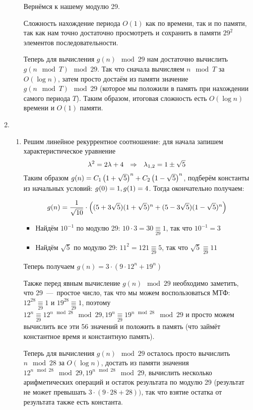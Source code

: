 \documentclass[a4paper,12pt]{article}
\begin{document}
\begin{solution}
\begin{enumerate}
\begin{enumerate}
			Вернёмся к нашему модулю 29.
			
			Сложность нахождение периода $O(1)$ как по времени, так и по памяти, так как нам точно достаточно просмотреть и сохранить в памяти $29^2$ элементов последовательности.
			
			Теперь для вычисления $g(n) \mod 29$ нам достаточно вычислить $g(n \mod T) \mod 29$. Так что сначала вычисляем $n \mod T$ за $O(\log n)$, затем просто достаём из памяти значение $g(n \mod T) \mod 29$ (которое мы положили в память при нахождении самого периода $T$). Таким образом, итоговая сложность есть $O(\log n)$ времени и $O(1)$ памяти.
			
		\end{enumerate}
	
	\item
	\begin{enumerate}
		\item 
	 Решим линейное рекуррентное соотношение: для начала запишем характеристическое уравнение
	$$\lambda^2 \hm{=} 2\lambda + 4 \ \ \Ra \ \ \lambda_{1, 2} \hm{=} 1 \pm \sqrt{5}$$
	Таким образом $g(n) \hm{=} C_1 \left(1 + \sqrt{5}\right)^n + C_2 \left(1 - \sqrt{5}\right)^n$, подберём константы из начальных условий: $g(0) \hm{=} 1, g(1) \hm{=} 4$. Тогда окончательно получаем:
	
	$$g(n) \hm{=} \dfrac{1}{\sqrt{10}} \cdot \left( (5+3\sqrt{5})(1+\sqrt{5})^n + (5-3\sqrt{5})(1-\sqrt{5})^n \right)$$
	
	\begin{itemize}
		\item Найдём $10^{-1}$ по модулю 29: $10 \cdot 3 = 30 \underset{29}{\equiv} 1$, так что $10^{-1} = 3$
		\item Найдём $\sqrt5$ по модулю 29: $11^2 = 121 \underset{29}{\equiv} 5$, так что $\sqrt5 \underset{29}{\equiv} 11$
	\end{itemize}
	Теперь получаем $g(n) = 3 \cdot (9 \cdot 12^n + 19^n)$
	
	Также перед явным вычисление $g(n) \mod 29$ необходимо заметить, что 29~---~простое число, так что мы можем воспользоваться МТФ: $12^{28} \underset{29}{\equiv} 1$ и $19^{28} \underset{29}{\equiv} 1$, поэтому $12^n \underset{29}{\equiv} 12^{n\mod 28} \mod 29, 19^n \underset{29}{\equiv} 19^{n\mod 28} \mod 29$ и просто можем вычислить все эти 56 значений и положить в память (что займёт константное время и константную память).
	
	Теперь для вычисления $g(n) \mod 29$ осталось просто вычислить $n \mod 28$ за $O(\log n)$, достать из памяти значения $12^{n\mod 28} \mod 29, 19^{n\mod 28} \mod 29$, вычислить несколько арифметических операций и остаток результата по модулю 29 (результат не может превышать $3 \cdot (9 \cdot 28 + 28))$, так что взятие остатка от результата также есть константа.
	

\end{enumerate}
\end{enumerate}
\end{solution}
\end{document}

